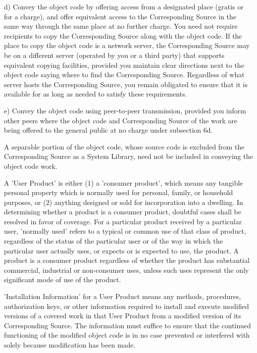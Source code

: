 \documentclass{article}
\begin{document}
    d) Convey the object code by offering access from a designated
    place (gratis or for a charge), and offer equivalent access to the
    Corresponding Source in the same way through the same place at no
    further charge.  You need not require recipients to copy the
    Corresponding Source along with the object code.  If the place to
    copy the object code is a network server, the Corresponding Source
    may be on a different server (operated by you or a third party)
    that supports equivalent copying facilities, provided you maintain
    clear directions next to the object code saying where to find the
    Corresponding Source.  Regardless of what server hosts the
    Corresponding Source, you remain obligated to ensure that it is
    available for as long as needed to satisfy these requirements.

    e) Convey the object code using peer-to-peer transmission, provided
    you inform other peers where the object code and Corresponding
    Source of the work are being offered to the general public at no
    charge under subsection 6d.

  A separable portion of the object code, whose source code is excluded
from the Corresponding Source as a System Library, need not be
included in conveying the object code work.

  A 'User Product' is either (1) a 'consumer product', which means any
tangible personal property which is normally used for personal, family,
or household purposes, or (2) anything designed or sold for incorporation
into a dwelling.  In determining whether a product is a consumer product,
doubtful cases shall be resolved in favor of coverage.  For a particular
product received by a particular user, 'normally used' refers to a
typical or common use of that class of product, regardless of the status
of the particular user or of the way in which the particular user
actually uses, or expects or is expected to use, the product.  A product
is a consumer product regardless of whether the product has substantial
commercial, industrial or non-consumer uses, unless such uses represent
the only significant mode of use of the product.

  'Installation Information' for a User Product means any methods,
procedures, authorization keys, or other information required to install
and execute modified versions of a covered work in that User Product from
a modified version of its Corresponding Source.  The information must
suffice to ensure that the continued functioning of the modified object
code is in no case prevented or interfered with solely because
modification has been made.
\end{document}
